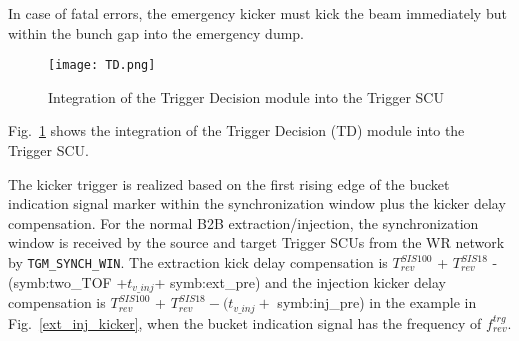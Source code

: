 In case of fatal errors, the emergency kicker must kick the beam immediately but within the bunch gap into the emergency dump.

%
 \begin{figure}[!htb]
   \centering   
   \texttt{[image: TD.png]}
   \caption{Integration of the Trigger Decision module into the Trigger SCU}
   \label{TD}
\end{figure}
Fig.~\ref{TD} shows the integration of the Trigger Decision (\gls{TD}) module into the Trigger SCU.  

The kicker trigger is realized based on the first rising edge of the bucket indication signal marker within the synchronization window plus the kicker delay compensation. For the normal B2B extraction/injection, the synchronization window is received by the source and target Trigger SCUs from the WR network by \verb|TGM_SYNCH_WIN|. The extraction kick delay compensation is $T_{\mathit{rev}}^{\mathit{SIS100}}$ + $T_{\mathit{rev}}^{\mathit{SIS18}}$ -(\gls{symb:two_TOF} +$ t_{v\_inj}$+ \gls{symb:ext_pre}) and the injection kicker delay compensation is $T_{\mathit{rev}}^{\mathit{SIS100}}$ + $T_{\mathit{rev}}^{\mathit{SIS18}} - (t_{v\_inj}+$ \gls{symb:inj_pre}) in the example in Fig.~\ref{ext_inj_kicker}, when the bucket indication signal has the frequency of $f_{\mathit{rev}}^{\mathit{trg}}$. 

